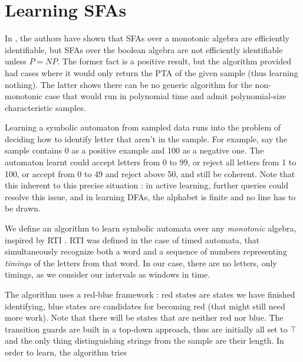 \documentclass[12pt, a4paper]{article}
\newcounter{thm}
\begin{document}
	\section{Learning SFAs}

	In \cite{FFZ}, the authors have shown that SFAs over a monotonic algebra are efficiently identifiable,
 but SFAs over the boolean algebra are not efficiently identifiable unless $P=NP$. The former fact is a positive result, but the algorithm provided had cases where it would only return the PTA of the given sample (thus learning nothing). The latter shows there can be no generic algorithm for the non-monotonic case that would run in polynomial time and admit polynomial-size characteristic samples. 

 Learning a symbolic automaton from sampled data runs into the problem of deciding how to identify letter that aren't in the sample. For example, say the sample contains 0 as a positive example and 100 as a negative one. The automaton learnt could accept letters from 0 to 99, or reject all letters from 1 to 100, or accept from 0 to 49 and reject above 50, and still be coherent. Note that this inherent to this precise situation : in active learning, further queries could resolve this issue, and in learning DFAs, the alphabet is finite and no line has to be drawn.


	We define an algorithm to learn symbolic automata over any \textit{monotonic} algebra, inspired by RTI \cite{VWW}. RTI was defined in the case of timed automata, that simultaneously recognize both a word and a sequence of numbers representing \textit{timings} of the letters from that word. In our case, there are no letters, only timings, as we consider our intervals as windows in time.

	The algorithm uses a red-blue framework : red states are states we have finished identifying, blue states are candidates for becoming red (that might still need more work). Note that there will be states that are neither red nor blue. The transition guards are built in a top-down approach, thus are initially all set to $\top$ and the only thing distinguishing strings from the sample are their length. In order to learn, the algorithm tries
	
	\printbibliography
\end{document}
